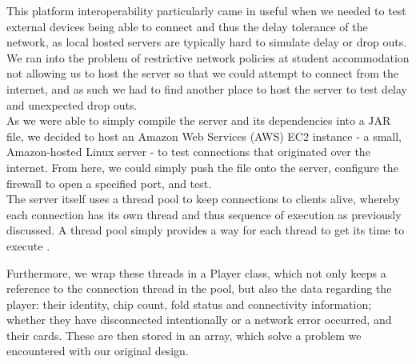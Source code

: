 \documentclass[11pt]{article}
\begin{document}
This platform interoperability particularly came in useful when we needed to test external devices being able to connect and thus the delay tolerance of the network, as local hosted servers are typically hard to simulate delay or drop outs. We ran into the problem of restrictive network policies at student accommodation not allowing us to host the server so that we could attempt to connect from the internet, and as such we had to find another place to host the server to test delay and unexpected drop outs. \\

As we were able to simply compile the server and its dependencies into a JAR file, we decided to host an Amazon Web Services (AWS) EC2 instance - a small, Amazon-hosted Linux server - to test connections that originated over the internet. From here, we could simply push the file onto the server, configure the firewall to open a specified port, and test. \\

The server itself uses a thread pool to keep connections to clients alive, whereby each connection has its own thread and thus sequence of execution as previously discussed. A thread pool simply provides a way for each thread to get its time to execute \cite{threadpool}. \\ 


\newpage

Furthermore, we wrap these threads in a Player class, which not only keeps a reference to the connection thread in the pool, but also the data regarding the player: their identity, chip count, fold status and connectivity information; whether they have disconnected intentionally or a network error occurred, and their cards. These are then stored in an array, which solve a problem we encountered with our original design.
\end{document}
